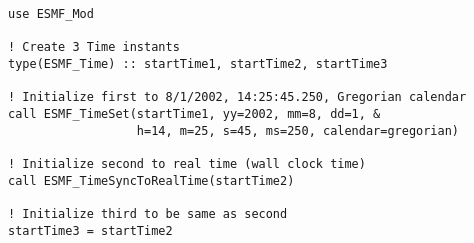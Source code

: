 
\begin{verbatim}
use ESMF_Mod

! Create 3 Time instants
type(ESMF_Time) :: startTime1, startTime2, startTime3

! Initialize first to 8/1/2002, 14:25:45.250, Gregorian calendar
call ESMF_TimeSet(startTime1, yy=2002, mm=8, dd=1, &
                  h=14, m=25, s=45, ms=250, calendar=gregorian)

! Initialize second to real time (wall clock time)
call ESMF_TimeSyncToRealTime(startTime2)

! Initialize third to be same as second
startTime3 = startTime2

\end{verbatim}
